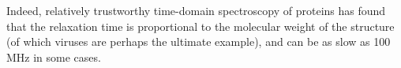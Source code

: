 \documentclass[paper.tex]{subfiles}
\begin{document}
\begin{multicols}{1}
%
%
%
%
%
%
%
%
%
%
%
%
%
%
%
%



Indeed, relatively trustworthy time-domain spectroscopy of proteins \cite{Microwave1994} has found that the relaxation time is proportional to the molecular weight of the structure (of which viruses are perhaps the ultimate example), and can be as slow as 100 MHz in some cases. 

%
%
%
%
%
%
%
%
%	



\end{multicols}
\end{document}

